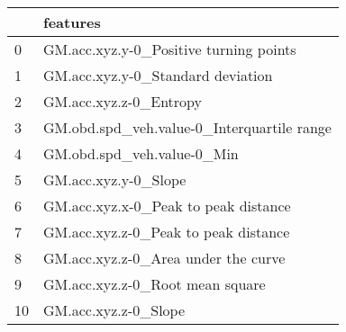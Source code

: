 \begin{tabular}{ll}
\toprule
{} &                                    features \\
\midrule
0  &      GM.acc.xyz.y-0\_Positive turning points \\
1  &           GM.acc.xyz.y-0\_Standard deviation \\
2  &                      GM.acc.xyz.z-0\_Entropy \\
3  &  GM.obd.spd\_veh.value-0\_Interquartile range \\
4  &                  GM.obd.spd\_veh.value-0\_Min \\
5  &                        GM.acc.xyz.y-0\_Slope \\
6  &        GM.acc.xyz.x-0\_Peak to peak distance \\
7  &        GM.acc.xyz.z-0\_Peak to peak distance \\
8  &         GM.acc.xyz.z-0\_Area under the curve \\
9  &             GM.acc.xyz.z-0\_Root mean square \\
10 &                        GM.acc.xyz.z-0\_Slope \\
\bottomrule
\end{tabular}
